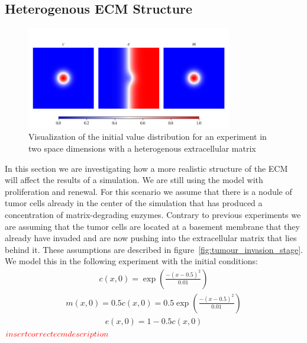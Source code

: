 \subsection{Heterogenous ECM Structure}
\begin{figure}[h]
    \centering
    \label{fig:Initial_Value_Distribution}
    \includegraphics[width=0.8\textwidth]{resources/images/2D_initial_conditions_heterogenous_ECM.png}
    \caption{Visualization of the initial value distribution for an experiment in two space dimensions with a heterogenous extracellular matrix}
    \label{fig:2D_heterogenous_ECM_initial}
\end{figure}
In this section we are investigating how a more realistic structure of the ECM will affect the results of a simulation. We are still using the model with proliferation and renewal. 
For this scenario we assume that there is a nodule of tumor cells already in the center of the simulation that has produced a concentration of matrix-degrading enzymes. Contrary to previous experiments we are assuming that the tumor cells are located at a basement membrane that they already have invaded and are now pushing into the extracellular matrix that lies behind it. These assumptions are described in figure~\ref{fig:tumour_invasion_stage}. We model this in the following experiment with the initial conditions:
\begin{align*}
    c(x,0)= \exp(\frac{-(x-0.5)^2}{0.01})
\end{align*}
\begin{align*}
    m(x,0) = 0.5 c(x,0) = 0.5 \exp(\frac{-(x-0.5)^2}{0.01})
\end{align*}
\begin{align*}
    e(x,0) = 1 - 0.5 c(x,0)
\end{align*}
$\textcolor{red}{insert correct ecm description}$

